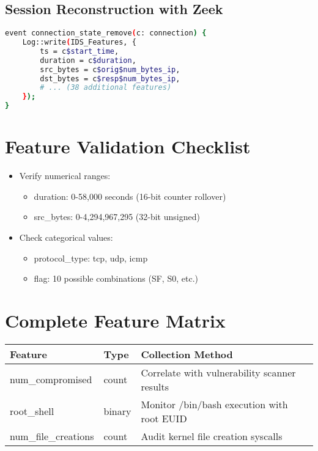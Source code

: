 \documentclass{article}
\begin{document}
\subsection{Session Reconstruction with Zeek}
\begin{lstlisting}[language=bash, caption={Zeek Script for Features}]
event connection_state_remove(c: connection) {
    Log::write(IDS_Features, {
        ts = c$start_time,
        duration = c$duration,
        src_bytes = c$orig$num_bytes_ip,
        dst_bytes = c$resp$num_bytes_ip,
        # ... (38 additional features)
    });
}
\end{lstlisting}

\section{Feature Validation Checklist}
\begin{itemize}
    \item Verify numerical ranges:
    \begin{itemize}
        \item duration: 0-58,000 seconds (16-bit counter rollover)
        \item src\_bytes: 0-4,294,967,295 (32-bit unsigned)
    \end{itemize}
    \item Check categorical values:
    \begin{itemize}
        \item protocol\_type: tcp, udp, icmp
        \item flag: 10 possible combinations (SF, S0, etc.)
    \end{itemize}
\end{itemize}

\section{Complete Feature Matrix}
\begin{tiny}
\begin{tabularx}{\textwidth}{llX}
    \toprule
    \textbf{Feature} & \textbf{Type} & \textbf{Collection Method} \\
    \midrule
    num\_compromised & count & Correlate with vulnerability scanner results \\
    root\_shell & binary & Monitor /bin/bash execution with root EUID \\
    num\_file\_creations & count & Audit kernel file creation syscalls \\
    \bottomrule
\end{tabularx}
\end{tiny}
\end{document}
